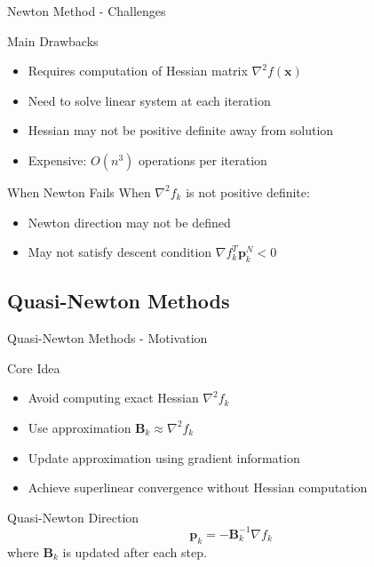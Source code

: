 \documentclass[aspectratio=1610]{beamer}
\begin{document}
\begin{frame}{Newton Method - Challenges}
  \begin{block}{Main Drawbacks}
    \begin{itemize}
      \item Requires computation of Hessian matrix $\nabla^2 f(\mathbf{x})$
      \item Need to solve linear system at each iteration
      \item Hessian may not be positive definite away from solution
      \item Expensive: $O(n^3)$ operations per iteration
    \end{itemize}
  \end{block}
  
  \vspace{0.5cm}
  \begin{block}{When Newton Fails}
    When $\nabla^2 f_k$ is not positive definite:
    \begin{itemize}
      \item Newton direction may not be defined
      \item May not satisfy descent condition $\nabla f_k^T \mathbf{p}_k^N < 0$
    \end{itemize}
  \end{block}
\end{frame}

\subsection{Quasi-Newton Methods}

\begin{frame}{Quasi-Newton Methods - Motivation}
  \begin{block}{Core Idea}
    \begin{itemize}
      \item Avoid computing exact Hessian $\nabla^2 f_k$
      \item Use approximation $\mathbf{B}_k \approx \nabla^2 f_k$
      \item Update approximation using gradient information
      \item Achieve superlinear convergence without Hessian computation
    \end{itemize}
  \end{block}
  
  \vspace{0.5cm}
  \begin{block}{Quasi-Newton Direction}
    $$\mathbf{p}_k = -\mathbf{B}_k^{-1} \nabla f_k$$
    where $\mathbf{B}_k$ is updated after each step.
  \end{block}
\end{frame}
\end{document}
